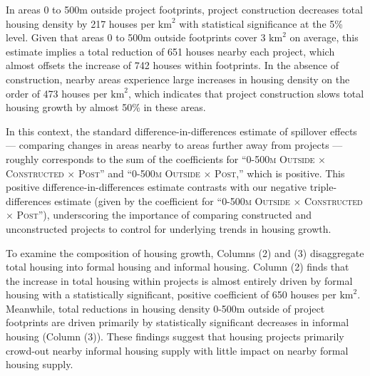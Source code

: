 \documentclass[12pt]{article}
\begin{document}
In areas 0 to 500m outside project footprints, project construction decreases total housing density by 217 houses per $\text{km}^{2}$ with statistical significance at the 5\% level.  Given that areas 0 to 500m outside footprints cover 3 $\text{km}^{2}$ on average, this estimate implies a total reduction of 651 houses nearby each project, which almost offsets the increase of 742 houses within footprints.  In the absence of construction, nearby areas experience large increases in housing density on the order of 473 houses per $\text{km}^{2}$, which indicates that project construction slows total housing growth by almost 50\% in these areas.  


In this context, the standard difference-in-differences estimate of spillover effects --- comparing changes in areas nearby to areas further away from projects --- roughly corresponds to the sum of the coefficients for ``\textsc{0-500m Outside} $\times$ \textsc{Constructed} $\times$ \textsc{Post}'' and ``\textsc{0-500m Outside} $\times$ \textsc{Post},'' which is positive.  This positive difference-in-differences estimate contrasts with our negative triple-differences estimate (given by the coefficient for ``\textsc{0-500m Outside} $\times$ \textsc{Constructed} $\times$ \textsc{Post}''), underscoring the importance of comparing constructed and unconstructed projects to control for underlying trends in housing growth.










To examine the composition of housing growth, Columns (2) and (3) disaggregate total housing into formal housing and informal housing.  Column (2) finds that the increase in total housing within projects is almost entirely driven by formal housing with a statistically significant, positive coefficient of 650 houses per $\text{km}^{2}$.  Meanwhile, total reductions in housing density 0-500m outside of project footprints are driven primarily by statistically significant decreases in informal housing (Column (3)).  These findings suggest that housing projects primarily crowd-out nearby informal housing supply with little impact on nearby formal housing supply.
\end{document}
